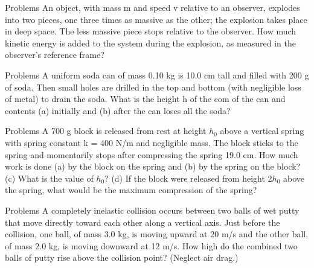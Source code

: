 \begin{frame}{Problems}
\small
An object, with mass m and speed v relative to an observer, explodes into two pieces, one three times as massive as the other; the explosion takes place in deep space. The less massive piece stops relative to the observer. How much kinetic energy is added to the system during the explosion, as measured in the observer's reference frame?
\vspace{10cm}
\end{frame}


\begin{frame}{Problems}
\small
A uniform soda can of mass 0.10 kg is 10.0 cm tall and filled with 200 g of soda. Then small holes are drilled in the top and bottom (with negligible loss of metal) to drain the soda. What is the height h of the com of the can and contents (a) initially and (b) after the can loses all the soda? 
\vspace{10cm}
\end{frame}

\begin{frame}{Problems}
\small
A 700 g block is released from rest at height $h_0$ above a vertical spring with spring constant k = 400 N/m and negligible mass. The block sticks to the spring and momentarily stops after compressing the spring 19.0 cm. How much work is done (a) by the block on the spring and (b) by the spring on the block? (c) What is the value of $h_0$? (d) If the block were released from height 2$h_0$ above the spring, what would be the maximum compression of the spring?
\vspace{10cm}
\end{frame}

\begin{frame}{Problems}
\small
A completely inelastic collision occurs between two balls of wet putty that move directly toward each other along a vertical axis. Just before the collision, one ball, of mass 3.0 kg, is moving upward at 20 m/s and the other ball, of mass 2.0 kg, is moving downward at 12 m/s. How high do the combined two balls of putty rise above the collision point? (Neglect air drag.)
\vspace{10cm}
\end{frame}


